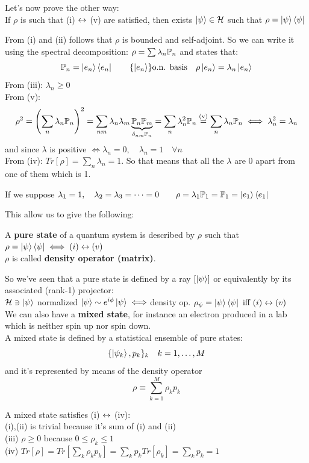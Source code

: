 Let's now prove the other way:\\
\Th If $\rho$ is such that (i) $\leftrightarrow$ (v) are satisfied, then exists $\left|\psi\right\rangle \in \mathcal{H}$ such that $\rho = \left|\psi\right\rangle\left\langle\psi\right|$

\Pf From (i) and (ii) follows that $\rho$ is bounded and self-adjoint. So we can write it using the spectral decomposition: $\rho = \sum \lambda_n \mathbb{P}_n$ and states that:
$$ \mathbb{P}_n = \left|e_n\right\rangle\left\langle e_n\right| \qquad \{\left|e_n\right\rangle\} \text{o.n. basis} \quad \rho\left|e_n\right\rangle = \lambda_n \left|e_n\right\rangle$$
From (iii): $\lambda_n \ge 0$ \\
From (v): $$\rho^2 = \left(\sum_n\lambda_n\mathbb{P}_n\right)^2 = \sum_{nm} \lambda_n\lambda_m \underbrace{\mathbb{P}_n\mathbb{P}_m}_{\delta_{nm}\mathbb{P}_n} = \sum_n \lambda_n^2 \mathbb{P}_n \stackrel{\text{(v)}}= \sum_n\lambda_n \mathbb{P}_n \iff \lambda_n^2 = \lambda_n$$
and since $\lambda$ is positive $\iff \lambda_n = 0, \quad \lambda_n = 1 \quad \forall n$\\
From (iv): $Tr[\rho] = \sum_n\lambda_n = 1$. So that means that all the $\lambda$ are 0 apart from one of them which is 1.

If we suppose $\lambda_1 = 1, \quad \lambda_2 = \lambda_3 = \dots = 0 \qquad \rho = \lambda_1 \mathbb{P}_1 = \mathbb{P}_1 = \left|e_1\right\rangle\left\langle e_1\right|$
\EndPf

This allow us to give the following:

\Def A \textbf{pure state} of a quantum system is described by $\rho$ such that $\rho = \left|\psi\right\rangle\left\langle\psi\right| \iff (i) \leftrightarrow (v)$\\
$\rho$ is called \textbf{density operator (matrix)}.

So we've seen that a pure state is defined by a ray $[\left|\psi\right\rangle]$ or equivalently by its associated (rank-1) projector: \\$\mathcal{H} \ni \left|\psi\right\rangle$ normalized $\left|\psi\right\rangle\sim e^{i\phi}\left|\psi\right\rangle \iff $density op. $\rho_\psi = \left|\psi\right\rangle\left\langle\psi\right| \text{ iff } (i) \leftrightarrow (v)$\\

We can also have a \textbf{mixed state}, for instance an electron produced in a lab which is neither spin up nor spin down.\\
A mixed state is defined by a statistical ensemble of pure states:
$$\{\left|\psi_k\right\rangle,p_k\}_k \quad k= 1,\dots,M $$
and it's represented by means of the density operator
$$ \rho \equiv \sum_{k=1}^M \rho_k p_k$$

A mixed state satisfies (i) $\leftrightarrow$ (iv):\\
(i),(ii) is trivial because it's sum of (i) and (ii)\\
(iii) $\rho \ge 0 $ because $0 \le \rho_k \le 1$\\
(iv) $Tr[\rho] = Tr[\sum_k \rho_kp_k] = \sum_k p_k Tr[\rho_k] = \sum_k p_k = 1$\\

